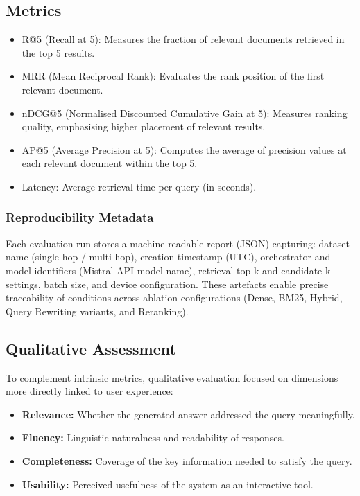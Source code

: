 \begin{spacing}{1.5}
\subsection{Metrics}\label{sec:metrics}


\begin{itemize}
    \item R@5 (Recall at 5): Measures the fraction of relevant documents retrieved in the top 5 results.
    \item MRR (Mean Reciprocal Rank): Evaluates the rank position of the first relevant document.
    \item nDCG@5 (Normalised Discounted Cumulative Gain at 5): Measures ranking quality, emphasising higher placement of relevant results.
    \item AP@5 (Average Precision at 5): Computes the average of precision values at each relevant document within the top 5.
    \item Latency: Average retrieval time per query (in seconds).
\end{itemize}

\subsubsection*{Reproducibility Metadata}

Each evaluation run stores a machine-readable report (JSON) capturing: dataset name (single-hop / multi-hop), creation timestamp (UTC), orchestrator and model identifiers (Mistral API model name), retrieval top-k and candidate-k settings, batch size, and device configuration. These artefacts enable precise traceability of conditions across ablation configurations (Dense, BM25, Hybrid, Query Rewriting variants, and Reranking).

\subsection{Qualitative Assessment}
To complement intrinsic metrics, qualitative evaluation focused on dimensions more directly linked to user experience:
\begin{itemize}
      \item \textbf{Relevance:} Whether the generated answer addressed the query meaningfully.
      \item \textbf{Fluency:} Linguistic naturalness and readability of responses.
      \item \textbf{Completeness:} Coverage of the key information needed to satisfy the query.
      \item \textbf{Usability:} Perceived usefulness of the system as an interactive tool.
\end{itemize}


\end{spacing}
